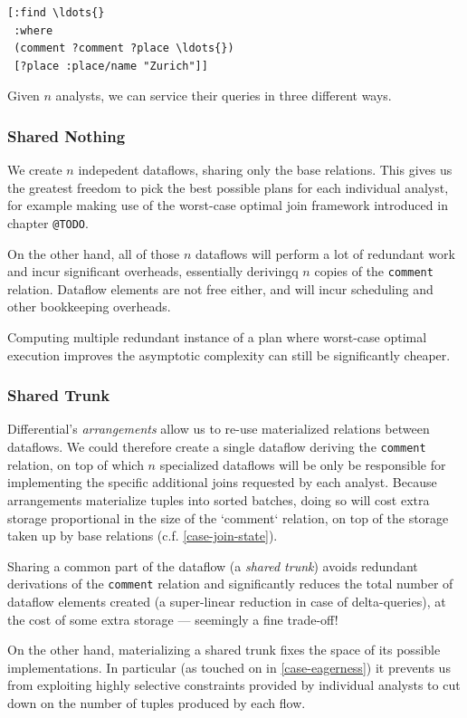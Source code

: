 \documentclass[../catalog.tex]{subfiles}
\begin{document}
\begin{verbatim}
[:find \ldots{}
 :where
 (comment ?comment ?place \ldots{})
 [?place :place/name "Zurich"]]
\end{verbatim}

Given $n$ analysts, we can service their queries in three different
ways.

\subsubsection{Shared Nothing}

We create $n$ indepedent dataflows, sharing only the base
relations. This gives us the greatest freedom to pick the best
possible plans for each individual analyst, for example making use of
the worst-case optimal join framework introduced in chapter
\texttt{@TODO}.

On the other hand, all of those $n$ dataflows will perform a lot of
redundant work and incur significant overheads, essentially derivingq
$n$ copies of the \texttt{comment} relation. Dataflow elements are not
free either, and will incur scheduling and other bookkeeping
overheads.

Computing multiple redundant instance of a plan where worst-case
optimal execution improves the asymptotic complexity can still be
significantly cheaper.

\subsubsection{Shared Trunk}

Differential's \emph{arrangements} allow us to re-use materialized
relations between dataflows. We could therefore create a single
dataflow deriving the \texttt{comment} relation, on top of which $n$
specialized dataflows will be only be responsible for implementing the
specific additional joins requested by each analyst. Because
arrangements materialize tuples into sorted batches, doing so will
cost extra storage proportional in the size of the `comment` relation,
on top of the storage taken up by base relations
(c.f. \ref{case-join-state}).

Sharing a common part of the dataflow (a \emph{shared trunk}) avoids
redundant derivations of the \texttt{comment} relation and
significantly reduces the total number of dataflow elements created (a
super-linear reduction in case of delta-queries), at the cost of some
extra storage — seemingly a fine trade-off!

On the other hand, materializing a shared trunk fixes the space of its
possible implementations. In particular (as touched on in
\ref{case-eagerness}) it prevents us from exploiting highly selective
constraints provided by individual analysts to cut down on the number
of tuples produced by each flow.
\end{document}
